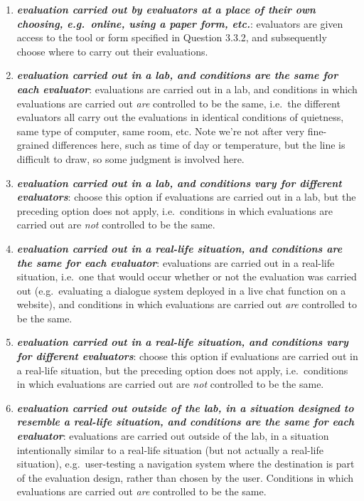 \documentclass[11pt,a4paper]{article}
\newcommand{\egcvalue}[1]{\textbf{\textit{#1}}}
\begin{document}
\begin{enumerate}[itemsep=0cm,leftmargin=0.5cm,label={\LARGE $\circ$}]
    \item \egcvalue{evaluation carried out by evaluators at a place of their own choosing, e.g.\ online, using a paper form, etc.}: evaluators are given access to the tool or form specified in Question 3.3.2, and subsequently choose where to carry out their evaluations.
    \item \egcvalue{evaluation carried out in a lab, and conditions are the same for each evaluator}: evaluations are carried out in a lab, and conditions in which evaluations are carried out \textit{are} controlled to be the same, i.e.\ the different evaluators all carry out the evaluations in identical conditions of quietness, same type of computer, same room, etc. Note we're not after very fine-grained differences here, such as time of day  or temperature, but the line is difficult to draw, so some judgment is involved here.
    \item \egcvalue{evaluation carried out in a lab, and conditions vary for different evaluators}: choose this option if evaluations are carried out in a lab, but the preceding option does not apply, i.e.\ conditions in which evaluations are carried out are \textit{not} controlled to be the same.
    \item \egcvalue{evaluation carried out in a real-life situation, and conditions are the same for each evaluator}: evaluations are carried out in a real-life situation, i.e.\ one that would occur whether or not the evaluation was carried out (e.g.\ evaluating a dialogue system deployed in a live chat function on a website), and conditions in which evaluations are carried out \textit{are} controlled to be the same. 
    \item \egcvalue{evaluation carried out in a real-life situation, and conditions vary for different evaluators}: choose this option if evaluations are carried out in a real-life situation, but the preceding option does not apply, i.e.\ conditions in which evaluations are carried out are \textit{not} controlled to be the same.
    \item \egcvalue{evaluation carried out outside of the lab, in a situation designed to resemble a real-life situation, and conditions are the same for each evaluator}: evaluations are carried out outside of the lab, in a situation intentionally similar to a real-life situation (but not actually a real-life situation), e.g.\ user-testing a navigation system where the destination is part of the evaluation design, rather than chosen by the user. Conditions in which evaluations are carried out \textit{are} controlled to be the same. 

\end{enumerate}
\end{document}
